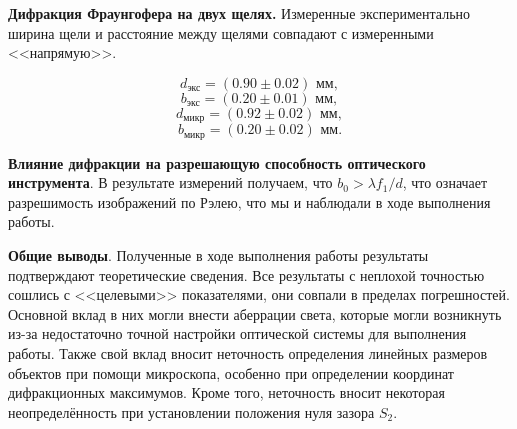 \documentclass[a4paper,12pt]{article} %
\begin{document}
\textbf{Дифракция Фраунгофера на двух щелях.} Измеренные экспериментально ширина щели и расстояние между щелями совпадают с измеренными <<напрямую>>.

\[ \boxed{d_\text{экс} = (0.90 \pm 0.02) \text{ мм},} \]
\[ \boxed{b_\text{экс} = (0.20 \pm 0.01) \text{ мм},} \]
\[ \boxed{d_\text{микр} = (0.92 \pm 0.02) \text{ мм},} \]
\[ \boxed{b_\text{микр} = (0.20 \pm 0.02) \text{ мм}.} \]

\textbf{Влияние дифракции на разрешающую способность оптического инструмента}. В результате измерений получаем, что $b_0 > \lambda f_1/d$, что означает разрешимость изображений по Рэлею, что мы и наблюдали в ходе выполнения работы.


\textbf{Общие выводы}. Полученные в ходе выполнения работы результаты подтверждают теоретические сведения. Все результаты с неплохой точностью сошлись с <<целевыми>> показателями, они совпали в пределах погрешностей. Основной вклад в них могли внести аберрации света, которые могли возникнуть из-за недостаточно точной настройки оптической системы для выполнения работы. Также свой вклад вносит неточность определения линейных размеров объектов при помощи микроскопа, особенно при определении координат дифракционных максимумов. Кроме того, неточность вносит некоторая неопределённость при установлении положения нуля зазора $ S_2 $.
\end{document}
